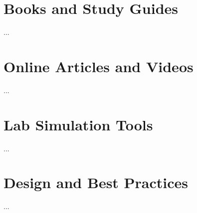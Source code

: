 \documentclass[12pt]{report}
\begin{document}
\section{Books and Study Guides}
...

\section{Online Articles and Videos}
...

\section{Lab Simulation Tools}
...

\section{Design and Best Practices}
...

\end{document}

